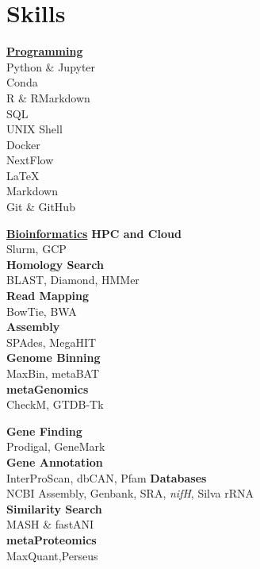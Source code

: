 \documentclass[letterpaper]{twentysecondcv3} %
\begin{document}
\makeprofile %
 

\section{Skills}
\setlength\multicolsep{0pt}
\begin{multicols}{4}
\textbf{\underline{Programming}}\\
Python \& Jupyter\\
Conda\\%
R \& RMarkdown\\
SQL\\
UNIX Shell\\
Docker\\
NextFlow\\
\LaTeX\\
Markdown\\
Git \& GitHub\columnbreak

\textbf{\underline{Bioinformatics}}
\textbf{HPC and Cloud}\\
Slurm, GCP\\
\textbf{Homology Search}\\
BLAST, Diamond, HMMer\\
\textbf{Read Mapping}\\
BowTie, BWA\\%
\textbf{Assembly}\\
SPAdes, MegaHIT\\
\textbf{Genome Binning}\\
MaxBin, metaBAT\\
\textbf{metaGenomics}\\
CheckM, GTDB-Tk\columnbreak

\textbf{Gene Finding}\\
Prodigal, GeneMark\\
\textbf{Gene Annotation}\\
InterProScan, dbCAN, Pfam
\textbf{Databases}\\
NCBI Assembly, Genbank, SRA, \emph{nifH}, Silva rRNA\\
\textbf{Similarity Search}\\
MASH \& fastANI\\
\textbf{metaProteomics}\\
MaxQuant,Perseus\columnbreak


\end{multicols}
\end{document}
